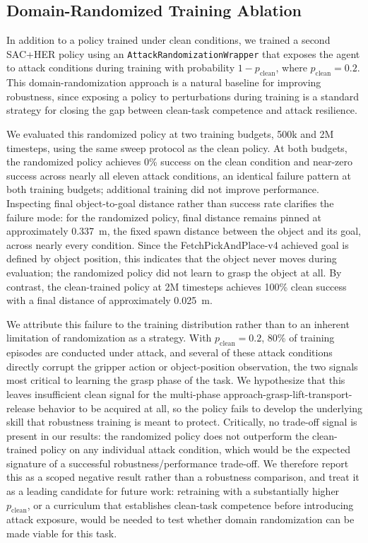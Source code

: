 \documentclass[conference]{IEEEtran}
\begin{document}
\subsection{Domain-Randomized Training Ablation}
\label{sec:randomized_ablation}

In addition to a policy trained under clean conditions, we trained a second SAC+HER
policy using an \texttt{AttackRandomizationWrapper} that exposes the agent to attack
conditions during training with probability $1-p_{\mathrm{clean}}$, where
$p_{\mathrm{clean}}=0.2$. This domain-randomization approach is a natural baseline for
improving robustness, since exposing a policy to perturbations during training is a
standard strategy for closing the gap between clean-task competence and attack
resilience.

We evaluated this randomized policy at two training budgets, 500k and 2M timesteps,
using the same sweep protocol as the clean policy. At both budgets, the randomized
policy achieves 0\% success on the clean condition and near-zero success across nearly
all eleven attack conditions, an identical failure pattern at both training budgets;
additional training did not improve performance. Inspecting final object-to-goal
distance rather than success rate clarifies the failure mode: for the randomized
policy, final distance remains pinned at approximately 0.337~m, the fixed spawn
distance between the object and its goal, across nearly every condition. Since the
FetchPickAndPlace-v4 achieved goal is defined by object position, this indicates that
the object never moves during evaluation; the randomized policy did not learn to grasp
the object at all. By contrast, the clean-trained policy at 2M timesteps achieves
100\% clean success with a final distance of approximately 0.025~m.

We attribute this failure to the training distribution rather than to an inherent
limitation of randomization as a strategy. With $p_{\mathrm{clean}}=0.2$, 80\% of
training episodes are conducted under attack, and several of these attack conditions
directly corrupt the gripper action or object-position observation, the two signals
most critical to learning the grasp phase of the task. We hypothesize that this leaves
insufficient clean signal for the multi-phase approach-grasp-lift-transport-release
behavior to be acquired at all, so the policy fails to develop the underlying skill
that robustness training is meant to protect. Critically, no trade-off signal is
present in our results: the randomized policy does not outperform the clean-trained
policy on any individual attack condition, which would be the expected signature of a
successful robustness/performance trade-off. We therefore report this as a scoped
negative result rather than a robustness comparison, and treat it as a leading
candidate for future work: retraining with a substantially higher $p_{\mathrm{clean}}$,
or a curriculum that establishes clean-task competence before introducing attack
exposure, would be needed to test whether domain randomization can be made viable for
this task.
\end{document}
